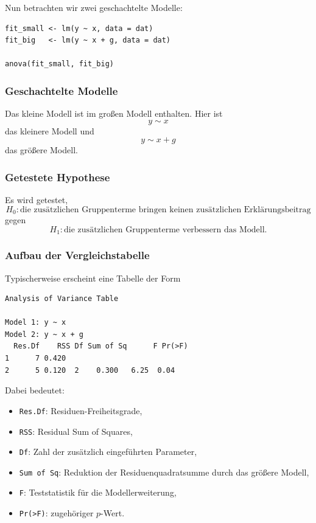 \documentclass[10pt, letterpaper]{article}
\begin{document}
Nun betrachten wir zwei geschachtelte Modelle:
\begin{verbatim}
fit_small <- lm(y ~ x, data = dat)
fit_big   <- lm(y ~ x + g, data = dat)

anova(fit_small, fit_big)
\end{verbatim}

\subsubsection{Geschachtelte Modelle}

Das kleine Modell ist im großen Modell enthalten. Hier ist
\[
y\sim x
\]
das kleinere Modell und
\[
y\sim x+g
\]
das größere Modell.

\subsubsection{Getestete Hypothese}

Es wird getestet,
\[
H_0:\text{die zusätzlichen Gruppenterme bringen keinen zusätzlichen Erklärungsbeitrag}
\]
gegen
\[
H_1:\text{die zusätzlichen Gruppenterme verbessern das Modell.}
\]

\subsubsection{Aufbau der Vergleichstabelle}

Typischerweise erscheint eine Tabelle der Form
\begin{verbatim}
Analysis of Variance Table

Model 1: y ~ x
Model 2: y ~ x + g
  Res.Df    RSS Df Sum of Sq      F Pr(>F)
1      7 0.420
2      5 0.120  2    0.300   6.25  0.04
\end{verbatim}

Dabei bedeutet:
\begin{itemize}
    \item \texttt{Res.Df}: Residuen-Freiheitsgrade,
    \item \texttt{RSS}: Residual Sum of Squares,
    \item \texttt{Df}: Zahl der zusätzlich eingeführten Parameter,
    \item \texttt{Sum of Sq}: Reduktion der Residuenquadratsumme durch das größere Modell,
    \item \texttt{F}: Teststatistik für die Modellerweiterung,
    \item \texttt{Pr(>F)}: zugehöriger \(p\)-Wert.
\end{itemize}
\end{document}
